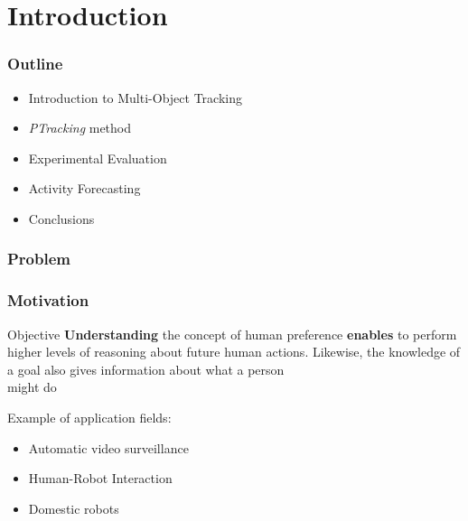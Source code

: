 \section{Introduction}

\begin{frame}
	\frametitle{Outline}
	
	\Large
	
	\begin{itemize}
		\item Introduction to Multi-Object Tracking
		\item \emph{PTracking} method
		\item Experimental Evaluation
		\item Activity Forecasting
		\item Conclusions
	\end{itemize}
\end{frame}

\begin{frame}
	\frametitle{Problem}
	
	\begin{center}
	\end{center}
\end{frame}

\begin{frame}
	\frametitle{Motivation}
	
	\vspace{0.4cm}
	
	\large
	
	\begin{block}{Objective}
		\textbf{Understanding} the concept of human preference \textbf{enables} to perform
		higher levels of reasoning about future human actions. Likewise, the knowledge of a
		goal also gives information about what a person\\ might do
	\end{block}
	
	\vspace{0.3cm}
	
	Example of application fields:
	
	\begin{itemize}
		\item Automatic video surveillance
		\item Human-Robot Interaction
		\item Domestic robots
	\end{itemize}
\end{frame}
